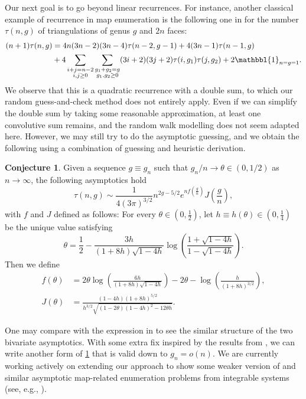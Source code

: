 \documentclass[a4paper,12pt]{article}
\theoremstyle{definition}
\newtheorem{conjecture}[theorem]{Conjecture}
\begin{document}
Our next goal is to go beyond linear recurrences. For instance, another classical example of recurrence in map enumeration is the following one in \cite{KP-triangulation} for the number $\tau(n, g)$ of triangulations of genus $g$ and $2n$ faces:
\begin{align}
  \begin{split} \label{eq:KP-triangulation}
    (n + 1) \tau(n, g) &= 4n (3n - 2) (3n - 4) \tau(n - 2, g - 1) + 4 (3n - 1) \tau(n - 1, g)\\
                       &+ 4 \sum_{\substack{i+j=n-2\\i,j\geq 0}} \sum_{\substack{g_1+g_2=g\\g_1,g_2\geq 0}} (3i + 2) (3j + 2) \tau(i, g_1) \tau(j, g_2) + 2 \mathbbl{1}_{n=g=1}.
  \end{split}
\end{align}
We observe that this is a quadratic recurrence with a double sum, to which our random guess-and-check method does not entirely apply. Even if we can simplify the double sum by taking some reasonable approximation, at least one convolutive sum remains, and the random walk modelling does not seem adapted here. However, we may still try to do the asymptotic guessing, and we obtain the following using a combination of guessing and heuristic derivation.



\begin{conjecture} \label{conj:triangulation}
  Given a sequence $g\equiv g_{n}$ such that $g_n / n \to\theta \in (0, 1/2)$ as $n\to\infty$, the following asymptotics hold
  \[
    \tau(n, g) \sim \frac{1}{4(3\pi)^{3/2}} n^{2g-5/2} e^{n f\left(\frac{g}{n}\right)} J\left( \frac{g}{n} \right),
  \]
  with $f$ and $J$ defined as follows: For every $\theta\in(0,\frac{1}{2})$, let $h\equiv h(\theta)\in(0,\frac{1}{4})$ be the unique value satisfying
  \[\theta = \frac{1}{2} - \frac{3h}{(1 + 8h)\sqrt{1 - 4h}} \log \left(\frac{1 + \sqrt{1 - 4h}}{1 - \sqrt{1 - 4h}}\right).\]
  Then we define
  \begin{align*}
    f(\theta) &= 2\theta \log\left(\frac{6h}{(1 + 8h)\sqrt{1 - 4h}}\right) - 2\theta - \log\left(\frac{h}{(1 + 8h)^{3/2}}\right), \\
    J(\theta) &= \frac{(1-4h)(1+8h)^{5/2}}{h^{3/2}\sqrt{(1-2\theta)(1-4h)^2-12\theta h}}.
  \end{align*}
\end{conjecture}


One may compare  with the expression in  to see the similar structure of the two bivariate asymptotics. With some extra fix inspired by the results from \cite{constant-tg}, we can write another form of \cref{conj:triangulation} that is valid down to $g_n = o(n)$. We are currently working actively on extending our approach to show some weaker version of  and similar asymptotic map-related enumeration problems from integrable systems (see, e.g., \cite{DYZ}).
\end{document}
